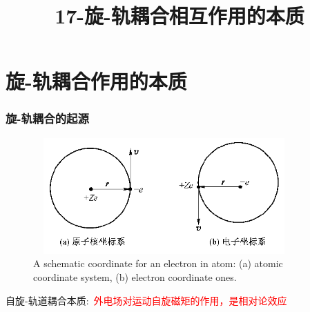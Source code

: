 \begin{thebibliography}{99}
\end{thebibliography}

\title{17-旋-轨耦合相互作用的本质}
\section{旋-轨耦合作用的本质}
\frame
{
\frametitle{旋-轨耦合的起源}
\begin{figure}[h!]
\centering
\includegraphics[height=1.75in,width=3.95in,viewport=0 0 600 270,clip]{Figures/SOC_cor.png}
\caption{\tiny \textrm{A schematic coordinate for an electron in atom: (a) atomic coordinate system, (b) electron coordinate ones.}}%
\label{Nuclear_Electron}
\end{figure}
自旋-轨道耦合本质:~\textcolor{red}{外电场对运动自旋磁矩的作用，是相对论效应}
}

